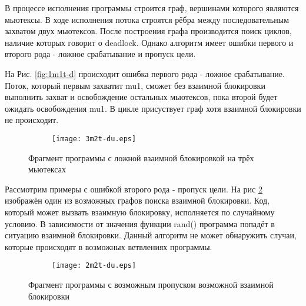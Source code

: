 \documentclass[runningheads, extrasrussian]{llncs}
\begin{document}
В процессе исполнения программы строится граф, вершинами которого являются мьютексы. В ходе исполнения потока строятся рёбра между последовательным захватом двух мьютексов. После построения графа производится поиск циклов, наличие которых говорит о deadlock. Однако алгоритм имеет ошибки первого и второго рода - ложное срабатывание и пропуск цели.

На Рис. \ref{fig:1m1t-d} происходит ошибка первого рода - ложное срабатывание. Поток, который первым захватит mu1, сможет без взаимной блокировки выполнить захват и освобождение остальных мьютексов, пока второй будет ожидать освобождения mu1. В цикле присуствует граф хотя взаимной блокировки не происходит.

\begin{figure}[htbp]
    \centering
    \begin{subfigure}[h]{0.4\textwidth}
        \centering
        
    \end{subfigure}
    \hfill
    \begin{subfigure}[h]{0.4\textwidth}
        \centering
        \texttt{[image: 3m2t-du.eps]}
    \end{subfigure}
    \caption{Фрагмент программы с ложной взаимной блокировкой на трёх мьютексах}%
    \label{fig:3m2t-du}
\end{figure}

Рассмотрим примеры с ошибкой второго рода - пропуск цели. На рис \ref{fig:2m2t-du} изображён один из возможных графов поиска взаимной блокировки. Код, который может вызвать взаимную блокировку, исполняется по случайному условию. В зависимости от значения функции rand() программа попадёт в ситуацию взаимной блокировки. Данный алгоритм не может обнаружить случаи, которые происходят в возможных ветвлениях программы.

\begin{figure}[htbp]
    \centering
    \begin{subfigure}[h]{0.4\textwidth}
        \centering
        
    \end{subfigure}
    \hfill
    \begin{subfigure}[h]{0.4\textwidth}
        \centering
        \texttt{[image: 2m2t-du.eps]}
    \end{subfigure}
    \caption{Фрагмент программы с возможным пропуском возможной взаимной блокировки}%
    \label{fig:2m2t-du}
\end{figure}
\end{document}

